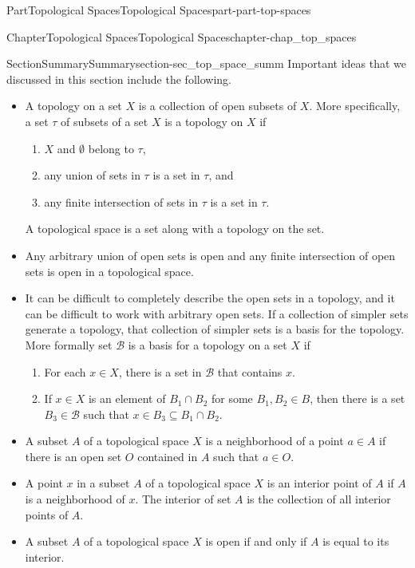 \documentclass[oneside,10pt,]{book}
\numberwithin{equation}{chapter}
\newcommand{\B}{\mathcal{B}}
\begin{document}
\begin{partptx}{Part}{Topological Spaces}{}{Topological Spaces}{}{}{part-part-top-spaces}
\begin{chapterptx}{Chapter}{Topological Spaces}{}{Topological Spaces}{}{}{chapter-chap_top_spaces}
\typeout{************************************************}
%
\begin{sectionptx}{Section}{Summary}{}{Summary}{}{}{section-sec_top_space_summ}
Important ideas that we discussed in this section include the following.%
\begin{itemize}[label=\textbullet]
\item{}A topology on a set \(X\) is a collection of open subsets of \(X\). More specifically, a set \(\tau\) of subsets of a set \(X\) is a topology on \(X\) if%
\begin{enumerate}
\item{}\(X\) and \(\emptyset\) belong to \(\tau\),%
\item{}any union of sets in \(\tau\) is a set in \(\tau\), and%
\item{}any finite intersection of sets in \(\tau\) is a set in \(\tau\).%
\end{enumerate}
A topological space is a set along with a topology on the set.%
\item{}Any arbitrary union of open sets is open and any finite intersection of open sets is open in a topological space.%
\item{}It can be difficult to completely describe the open sets in a topology, and it can be difficult to work with arbitrary open sets. If a collection of simpler sets generate a topology, that collection of simpler sets is a basis for the topology. More formally set \(\B\) is a basis for a topology on a set \(X\) if%
\begin{enumerate}
\item{}For each \(x \in X\), there is a set in \(\B\) that contains \(x\).%
\item{}If \(x \in X\) is an element of \(B_1 \cap B_2\) for some \(B_1, B_2 \in B\), then there is a set \(B_3 \in \B\) such that \(x \in B_3 \subseteq B_1 \cap B_2\).%
\end{enumerate}
%
\item{}A subset \(A\) of a topological space \(X\) is a neighborhood of a point \(a \in A\) if there is an open set \(O\) contained in \(A\) such that \(a \in O\).%
\item{}A point \(x\) in a subset \(A\) of a topological space \(X\) is an interior point of \(A\) if \(A\) is a neighborhood of \(x\). The interior of set \(A\) is the collection of all interior points of \(A\).%
\item{}A subset \(A\) of a topological space \(X\) is open if and only if \(A\) is equal to its interior.%
\end{itemize}

\end{sectionptx}
\end{chapterptx}
\end{partptx}
\end{document}
